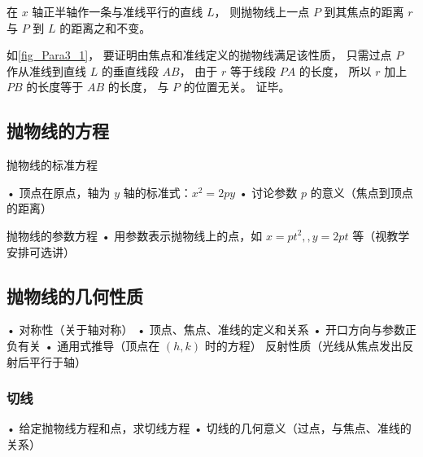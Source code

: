 在 $x$ 轴正半轴作一条与准线平行的直线 $L$， 则抛物线上一点 $P$ 到其焦点的距离 $r$ 与 $P$ 到 $L$ 的距离之和不变。

如\autoref{fig_Para3_1}， 要证明由焦点和准线定义的抛物线满足该性质， 只需过点 $P$ 作从准线到直线 $L$ 的垂直线段 $AB$， 由于 $r$ 等于线段 $PA$ 的长度， 所以 $r$ 加上 $PB$ 的长度等于 $AB$ 的长度， 与 $P$ 的位置无关。 证毕。


\subsection{抛物线的方程}

\begin{theorem}{抛物线的标准方程}

\end{theorem}
	•	顶点在原点，轴为 $y$ 轴的标准式：$x^2=2py$
	•	讨论参数 $p$ 的意义（焦点到顶点的距离）
\begin{theorem}{抛物线的参数方程}
	•	用参数表示抛物线上的点，如 $x=pt^2,,y=2pt$ 等（视教学安排可选讲）
\end{theorem}

\subsection{抛物线的几何性质}
	•	对称性（关于轴对称）
	•	顶点、焦点、准线的定义和关系
	•	开口方向与参数正负有关
	•	通用式推导（顶点在 $(h,k)$ 时的方程）
    反射性质（光线从焦点发出反射后平行于轴）
\subsubsection{切线}
	•	给定抛物线方程和点，求切线方程
	•	切线的几何意义（过点，与焦点、准线的关系）
